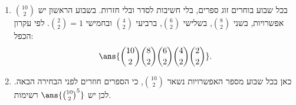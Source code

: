 \begin{enumerate}
\begin{enumerate}
\end{enumerate}
\begin{solbox}
\begin{enumerate}
\item בכל שבוע בוחרים זוג ספרים, בלי חשיבות לסדר ובלי חזרות. בשבוע הראשון יש $\binom{10}2$ אפשרויות, בשני $\binom82$, בשלישי $\binom62$, ברביעי $\binom42$ ובחמישי $\binom22=1$. לפי עקרון הכפל:
\[
\ans{\binom{10}2\binom82\binom62\binom42\binom22}.
\]
\item כאן בכל שבוע מספר האפשרויות נשאר $\binom{10}2$, כי הספרים חוזרים לפני הבחירה הבאה. לכן יש $\ans{\binom{10}2^5}$ רשימות.
\end{enumerate}
\end{solbox}
\end{enumerate}
